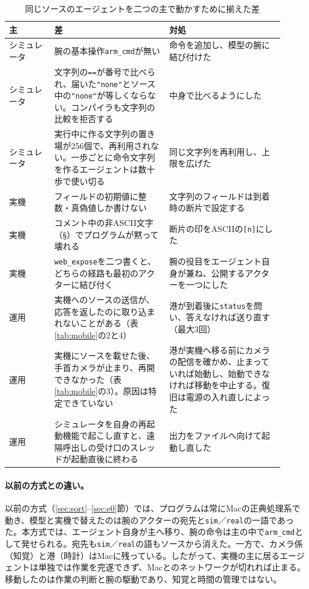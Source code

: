 \documentclass[10pt,letterpaper]{article}
\begin{document}
\begin{table}[h]
\centering\small
\caption{同じソースのエージェントを二つの主で動かすために揃えた差}
\label{tab:portability}
\begin{tabular}{p{0.15\linewidth}p{0.38\linewidth}p{0.38\linewidth}}
\toprule
主 & 差 & 対処 \\
\midrule
シミュレータ & 腕の基本操作\texttt{arm\_cmd}が無い & 命令を追加し、模型の腕に結び付けた \\
シミュレータ & 文字列の\texttt{==}が番号で比べられ、届いた\texttt{"none"}とソース中の\texttt{"none"}が等しくならない。コンパイラも文字列の比較を拒否する & 中身で比べるようにした \\
シミュレータ & 実行中に作る文字列の置き場が256個で、再利用されない。一歩ごとに命令文字列を作るエージェントは数十歩で使い切る & 同じ文字列を再利用し、上限を広げた \\
実機 & フィールドの初期値に整数・真偽値しか書けない & 文字列のフィールドは到着時の断片で設定する \\
実機 & コメント中の非ASCII文字（\S）でプログラムが黙って壊れる & 断片の印をASCIIの\texttt{[n]}にした \\
実機 & \texttt{web\_expose}を二つ書くと、どちらの経路も最初のアクターに結び付く & 腕の役目をエージェント自身が兼ね、公開するアクターを一つにした \\
\midrule
運用 & 実機へのソースの送信が、応答を返したのに取り込まれないことがある（表\ref{tab:mobile}の2と4） & 港が到着後に\texttt{status}を問い、答えなければ送り直す（最大3回） \\
運用 & 実機にソースを載せた後、手首カメラが止まり、再開できなかった（表\ref{tab:mobile}の3）。原因は特定できていない & 港が実機へ移る前にカメラの配信を確かめ、止まっていれば始動し、始動できなければ移動を中止する。復旧は電源の入れ直しによった \\
運用 & シミュレータを自身の再起動機能で起こし直すと、遠隔呼出しの受け口のスレッドが起動直後に終わる & 出力をファイルへ向けて起動し直した \\
\bottomrule
\end{tabular}
\end{table}

\paragraph{以前の方式との違い。}以前の方式（\ref{sec:sort}--\ref{sec:e0}節）では、プログラムは常にMacの正典処理系で動き、模型と実機で替えたのは腕のアクターの宛先と\texttt{sim}／\texttt{real}の一語であった。本方式では、エージェント自身が主へ移り、腕の命令は主の中で\texttt{arm\_cmd}として発せられる。宛先も\texttt{sim}／\texttt{real}の語もソースから消えた。一方で、カメラ係（知覚）と港（時計）はMacに残っている。したがって、実機の主に居るエージェントは単独では作業を完遂できず、Macとのネットワークが切れれば止まる。移動したのは作業の判断と腕の駆動であり、知覚と時間の管理ではない。
\end{document}
